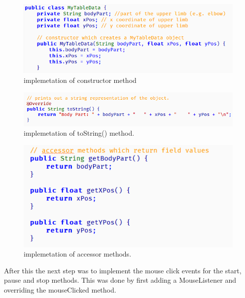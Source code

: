 \documentclass[a4paper, 12pt]{article}
\begin{document}
\begin{figure}[!htb]
	\begin{center}
  \includegraphics[scale=1.0]{codesnippet11.png}
  	\caption{implemetation of constructor method}
  \end{center} 
  \label{fig: codesnippet10} 
\end{figure}

\begin{figure}[!htb]
	\begin{center}
  \includegraphics[scale=0.9]{codesnippet13.png}
  	\caption{implemetation of toString() method.}
  \end{center} 
  \label{fig: codesnippet12} 
\end{figure}

\begin{figure}
	\begin{center}
  \includegraphics[scale=0.9]{codesnippet12.png}
  	\caption{implemetation of accessor methods.}
  \end{center} 
  \label{fig: codesnippet11} 
\end{figure}




After this the next step was to implement the mouse click events for the start, pause and stop methods. This was done by first adding a MouseListener and overriding the mouseClicked method. 
\end{document}

